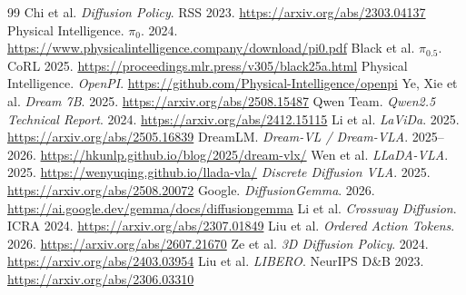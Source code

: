 \documentclass[conference]{IEEEtran}
\begin{document}

\begin{thebibliography}{99}
 Chi et al. \textit{Diffusion Policy}. RSS 2023. \url{https://arxiv.org/abs/2303.04137}
 Physical Intelligence. \textit{$\pi_0$}. 2024. \url{https://www.physicalintelligence.company/download/pi0.pdf}
 Black et al. \textit{$\pi_{0.5}$}. CoRL 2025. \url{https://proceedings.mlr.press/v305/black25a.html}
 Physical Intelligence. \textit{OpenPI}. \url{https://github.com/Physical-Intelligence/openpi}
 Ye, Xie et al. \textit{Dream 7B}. 2025. \url{https://arxiv.org/abs/2508.15487}
 Qwen Team. \textit{Qwen2.5 Technical Report}. 2024. \url{https://arxiv.org/abs/2412.15115}
 Li et al. \textit{LaViDa}. 2025. \url{https://arxiv.org/abs/2505.16839}
 DreamLM. \textit{Dream-VL / Dream-VLA}. 2025--2026. \url{https://hkunlp.github.io/blog/2025/dream-vlx/}
 Wen et al. \textit{LLaDA-VLA}. 2025. \url{https://wenyuqing.github.io/llada-vla/}
 \textit{Discrete Diffusion VLA}. 2025. \url{https://arxiv.org/abs/2508.20072}
 Google. \textit{DiffusionGemma}. 2026. \url{https://ai.google.dev/gemma/docs/diffusiongemma}
 Li et al. \textit{Crossway Diffusion}. ICRA 2024. \url{https://arxiv.org/abs/2307.01849}
 Liu et al. \textit{Ordered Action Tokens}. 2026. \url{https://arxiv.org/abs/2607.21670}
 Ze et al. \textit{3D Diffusion Policy}. 2024. \url{https://arxiv.org/abs/2403.03954}
 Liu et al. \textit{LIBERO}. NeurIPS D\&B 2023. \url{https://arxiv.org/abs/2306.03310}
\end{thebibliography}
\end{document}
